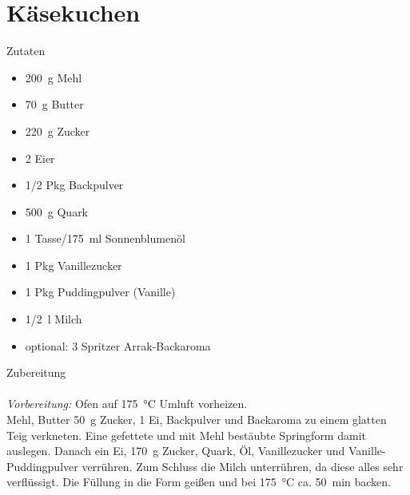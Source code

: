 \section*{Käsekuchen}
\ihead{}\ohead{}
\cfoot{}
{\Large Zutaten}
\begin{multicols}{2}
\begin{itemize}
    \item \SI{200}{g} Mehl
    \item \SI{70}{g} Butter
    \item \SI{220}{g} Zucker
    \item \num{2} Eier
    \item \num{1/2} Pkg Backpulver
    \item \SI{500}{g} Quark
    \item \num{1} Tasse/\SI{175}{ml} Sonnenblumenöl
    \item \num{1} Pkg Vanillezucker
    \item \num{1} Pkg Puddingpulver (Vanille)
    \item \SI{1/2}{l} Milch
    \item optional: \num{3} Spritzer Arrak-Backaroma
\end{itemize}
\end{multicols}
\noindent
{\Large Zubereitung}\\
\\
\textit{Vorbereitung:} Ofen auf \SI{175}{\celsius} Umluft vorheizen.\\
Mehl, Butter \SI{50}{g} Zucker, \num{1} Ei, Backpulver und Backaroma zu einem glatten Teig verkneten.
Eine gefettete und mit Mehl bestäubte Springform damit auslegen.
Danach ein Ei, \SI{170}{g} Zucker, Quark, Öl, Vanillezucker und Vanille-Puddingpulver verrühren.
Zum Schluss die Milch unterrühren, da diese alles sehr verflüssigt.
Die Füllung in die Form geißen und bei \SI{175}{\celsius} ca. \SI{50}{min} backen.
